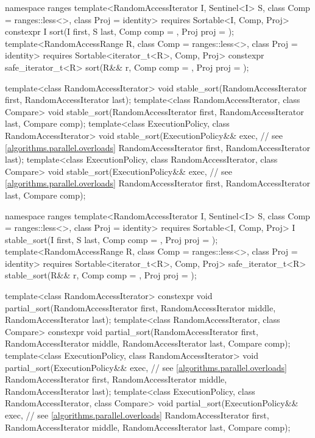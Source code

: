 \begin{codeblock}
{  namespace ranges {
    template<RandomAccessIterator I, Sentinel<I> S, class Comp = ranges::less<>,
        class Proj = identity>
      requires Sortable<I, Comp, Proj>
      constexpr I
        sort(I first, S last, Comp comp = {}, Proj proj = {});
    template<RandomAccessRange R, class Comp = ranges::less<>, class Proj = identity>
      requires Sortable<iterator_t<R>, Comp, Proj>
      constexpr safe_iterator_t<R>
        sort(R&& r, Comp comp = {}, Proj proj = {});
  }

  template<class RandomAccessIterator>
    void stable_sort(RandomAccessIterator first, RandomAccessIterator last);
  template<class RandomAccessIterator, class Compare>
    void stable_sort(RandomAccessIterator first, RandomAccessIterator last,
                     Compare comp);
  template<class ExecutionPolicy, class RandomAccessIterator>
    void stable_sort(ExecutionPolicy&& exec, // see \ref{algorithms.parallel.overloads}
                     RandomAccessIterator first, RandomAccessIterator last);
  template<class ExecutionPolicy, class RandomAccessIterator, class Compare>
    void stable_sort(ExecutionPolicy&& exec, // see \ref{algorithms.parallel.overloads}
                     RandomAccessIterator first, RandomAccessIterator last,
                     Compare comp);

  namespace ranges {
    template<RandomAccessIterator I, Sentinel<I> S, class Comp = ranges::less<>,
        class Proj = identity>
      requires Sortable<I, Comp, Proj>
      I stable_sort(I first, S last, Comp comp = {}, Proj proj = {});
    template<RandomAccessRange R, class Comp = ranges::less<>, class Proj = identity>
      requires Sortable<iterator_t<R>, Comp, Proj>
      safe_iterator_t<R>
        stable_sort(R&& r, Comp comp = {}, Proj proj = {});
  }

  template<class RandomAccessIterator>
    constexpr void partial_sort(RandomAccessIterator first,
                                RandomAccessIterator middle,
                                RandomAccessIterator last);
  template<class RandomAccessIterator, class Compare>
    constexpr void partial_sort(RandomAccessIterator first,
                                RandomAccessIterator middle,
                                RandomAccessIterator last, Compare comp);
  template<class ExecutionPolicy, class RandomAccessIterator>
    void partial_sort(ExecutionPolicy&& exec, // see \ref{algorithms.parallel.overloads}
                      RandomAccessIterator first,
                      RandomAccessIterator middle,
                      RandomAccessIterator last);
  template<class ExecutionPolicy, class RandomAccessIterator, class Compare>
    void partial_sort(ExecutionPolicy&& exec, // see \ref{algorithms.parallel.overloads}
                      RandomAccessIterator first,
                      RandomAccessIterator middle,
                      RandomAccessIterator last, Compare comp);

}
\end{codeblock}
